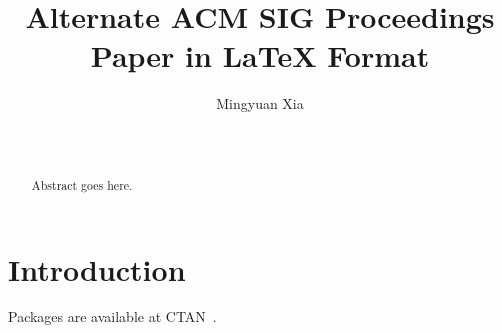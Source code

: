 \documentclass{sig-alternate}
\newcommand{\cameraready}[2]{#1} %
\begin{document}
%

\title{Alternate {\ttlit ACM} SIG Proceedings Paper in LaTeX
Format}

\author{
\alignauthor
Mingyuan Xia\\
       \\
       \\
}

\maketitle
\begin{abstract}
Abstract goes here.
\end{abstract}

\cameraready{}{
\category{H.4}{Information Systems Applications}{Miscellaneous}
\category{D.2.8}{Software Engineering}{Metrics}[complexity measures, performance measures]

\terms{Theory}

\keywords{ACM proceedings, \LaTeX, text tagging}
}

\section{Introduction}
Packages are available at CTAN~\cite{greenwade93}.


\balance
{\footnotesize 
}

\end{document}
